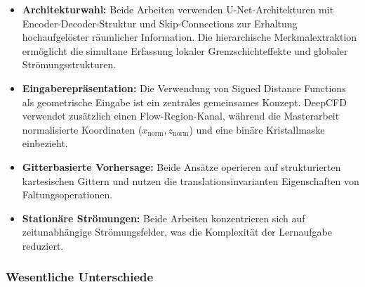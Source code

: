 \documentclass[a4paper,12pt]{article}
\begin{document}
\begin{itemize}
    \item \textbf{Architekturwahl:} Beide Arbeiten verwenden U-Net-Architekturen mit Encoder-Decoder-Struktur und Skip-Connections zur Erhaltung hochaufgelöster räumlicher Information. Die hierarchische Merkmalextraktion ermöglicht die simultane Erfassung lokaler Grenzschichteffekte und globaler Strömungsstrukturen.
    
    \item \textbf{Eingaberepräsentation:} Die Verwendung von Signed Distance Functions als geometrische Eingabe ist ein zentrales gemeinsames Konzept. DeepCFD verwendet zusätzlich einen Flow-Region-Kanal, während die Masterarbeit normalisierte Koordinaten ($x_{\text{norm}}, z_{\text{norm}}$) und eine binäre Kristallmaske einbezieht.
    
    \item \textbf{Gitterbasierte Vorhersage:} Beide Ansätze operieren auf strukturierten kartesischen Gittern und nutzen die translationsinvarianten Eigenschaften von Faltungsoperationen.
    
    \item \textbf{Stationäre Strömungen:} Beide Arbeiten konzentrieren sich auf zeitunabhängige Strömungsfelder, was die Komplexität der Lernaufgabe reduziert.
\end{itemize}

\subsubsection*{Wesentliche Unterschiede}
\end{document}
